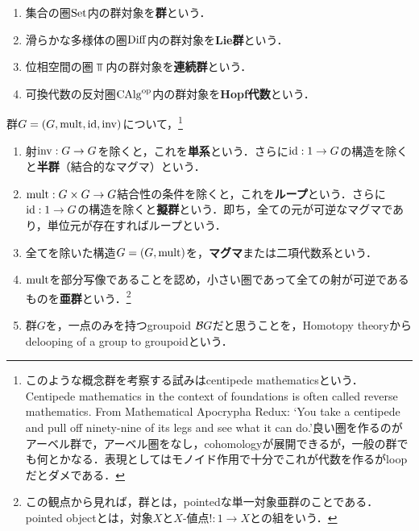 \documentclass[uplatex,dvipdfmx]{jsreport}
\begin{document}
\begin{definition}\mbox{}
    \begin{enumerate}
        \item 集合の圏$\mathrm{Set}$内の群対象を\textbf{群}という．
        \item 滑らかな多様体の圏$\mathrm{Diff}$内の群対象を\textbf{Lie群}という．
        \item 位相空間の圏$\Top$内の群対象を\textbf{連続群}という．
        \item 可換代数の反対圏$\mathrm{CAlg}^{\mathrm{op}}$内の群対象を\textbf{Hopf代数}という．
    \end{enumerate}
\end{definition}

\begin{definition}
    群$G=(G,\mathrm{mult},\mathrm{id},\mathrm{inv})$について，\footnote{このような概念群を考察する試みはcentipede mathematicsという．Centipede mathematics in the context of foundations is often called reverse mathematics. From Mathematical Apocrypha Redux: ‘You take a centipede and pull off ninety-nine of its legs and see what it can do.’良い圏を作るのがアーベル群で，アーベル圏をなし，cohomologyが展開できるが，一般の群でも何とかなる．表現としてはモノイド作用で十分でこれが代数を作るがloopだとダメである．}
    \begin{enumerate}
        \item 射$\mathrm{inv}:G\to G$を除くと，これを\textbf{単系}という．さらに$\mathrm{id}:1\to G$の構造を除くと\textbf{半群}（結合的なマグマ）という．
        \item $\mathrm{mult}:G\times G\to G$結合性の条件を除くと，これを\textbf{ループ}という．さらに$\mathrm{id}:1\to G$の構造を除くと\textbf{擬群}という．即ち，全ての元が可逆なマグマであり，単位元が存在すればループという．
        \item 全てを除いた構造$G=(G,\mathrm{mult})$を，\textbf{マグマ}または二項代数系という．
        \item $\mathrm{mult}$を部分写像であることを認め，小さい圏であって全ての射が可逆であるものを\textbf{亜群}という．\footnote{この観点から見れば，群とは，pointedな単一対象亜群のことである．pointed objectとは，対象$X$と$X$-値点$!:1\to X$との組をいう．}
        \item 群$G$を，一点のみを持つgroupoid $\mathcal{B} G$だと思うことを，Homotopy theoryからdelooping of a group to groupoidという．
    \end{enumerate}
\end{definition}
\end{document}
